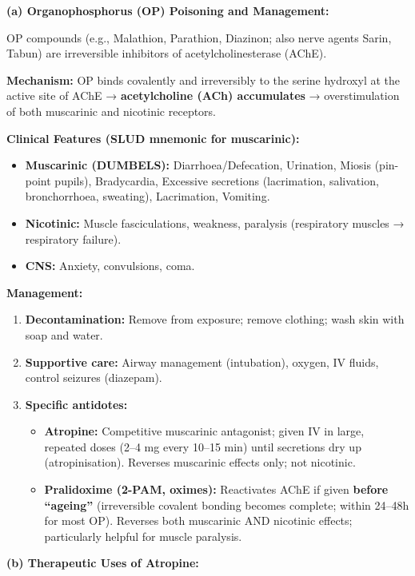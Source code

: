 \documentclass[11pt,a4paper]{article}
\begin{document}
\begin{ansbox}
\textbf{(a) Organophosphorus (OP) Poisoning and Management:}

OP compounds (e.g., Malathion, Parathion, Diazinon; also nerve agents Sarin, Tabun) are irreversible inhibitors of acetylcholinesterase (AChE).

\textbf{Mechanism:} OP binds covalently and irreversibly to the serine hydroxyl at the active site of AChE → \textbf{acetylcholine (ACh) accumulates} → overstimulation of both muscarinic and nicotinic receptors.

\textbf{Clinical Features (SLUD mnemonic for muscarinic):}
\begin{itemize}[leftmargin=*]
    \item \textbf{Muscarinic (DUMBELS):} Diarrhoea/Defecation, Urination, Miosis (pin-point pupils), Bradycardia, Excessive secretions (lacrimation, salivation, bronchorrhoea, sweating), Lacrimation, Vomiting.
    \item \textbf{Nicotinic:} Muscle fasciculations, weakness, paralysis (respiratory muscles → respiratory failure).
    \item \textbf{CNS:} Anxiety, convulsions, coma.
\end{itemize}

\textbf{Management:}
\begin{enumerate}[leftmargin=*]
    \item \textbf{Decontamination:} Remove from exposure; remove clothing; wash skin with soap and water.
    \item \textbf{Supportive care:} Airway management (intubation), oxygen, IV fluids, control seizures (diazepam).
    \item \textbf{Specific antidotes:}
    \begin{itemize}
        \item \textbf{Atropine:} Competitive muscarinic antagonist; given IV in large, repeated doses (2--4 mg every 10--15 min) until secretions dry up (atropinisation). Reverses muscarinic effects only; not nicotinic.
        \item \textbf{Pralidoxime (2-PAM, oximes):} Reactivates AChE if given \textbf{before ``ageing''} (irreversible covalent bonding becomes complete; within 24--48h for most OP). Reverses both muscarinic AND nicotinic effects; particularly helpful for muscle paralysis.
    \end{itemize}
\end{enumerate}

\textbf{(b) Therapeutic Uses of Atropine:}


\end{ansbox}
\end{document}
